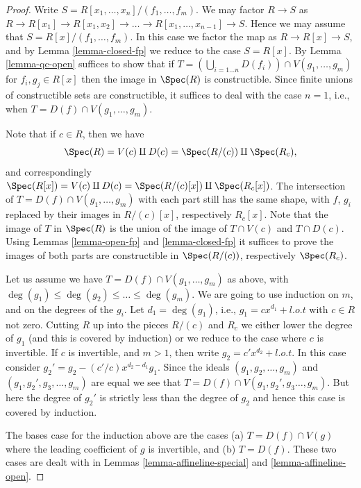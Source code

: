 \begin{proof}
Write $S = R[x_1, \ldots, x_n]/(f_1, \ldots, f_m)$.
We may factor $R \to S$ as $R \to R[x_1] \to R[x_1, x_2]
\to \ldots \to R[x_1, \ldots, x_{n-1}] \to S$. Hence
we may assume that $S = R[x]/(f_1, \ldots, f_m)$.
In this case we factor the map as $R \to R[x] \to S$,
and by Lemma \ref{lemma-closed-fp} we reduce to
the case $S = R[x]$. By Lemma \ref{lemma-qc-open} suffices
to show that if
$T = (\bigcup_{i = 1\ldots n} D(f_i)) \cap V(g_1, \ldots, g_m)$
for $f_i , g_j \in R[x]$ then the image in $\Spec(R)$ is
constructible. Since finite unions of constructible sets
are constructible, it suffices to deal with the case $n = 1$,
i.e., when $T = D(f) \cap V(g_1, \ldots, g_m)$.

\medskip\noindent
Note that if $c \in R$, then we have
$$
\Spec(R) =
V(c) \amalg D(c) =
\Spec(R/(c)) \amalg \Spec(R_c),
$$
and correspondingly $\Spec(R[x]) =
V(c) \amalg D(c) = \Spec(R/(c)[x]) \amalg
\Spec(R_c[x])$. The intersection of $T = D(f) \cap V(g_1, \ldots, g_m)$
with each part still has the same shape, with $f$, $g_i$ replaced
by their images in $R/(c)[x]$, respectively $R_c[x]$.
Note that the image of $T$
in $\Spec(R)$ is the union of the image of
$T \cap V(c)$ and $T \cap D(c)$. Using Lemmas \ref{lemma-open-fp}
and \ref{lemma-closed-fp} it suffices to prove the images of both
parts are constructible in $\Spec(R/(c))$, respectively
$\Spec(R_c)$.

\medskip\noindent
Let us assume we have $T = D(f) \cap V(g_1, \ldots, g_m)$
as above, with $\deg(g_1) \leq \deg(g_2) \leq \ldots \leq \deg(g_m)$.
We are going to use induction on $m$, and on the
degrees of the $g_i$. Let $d_1 = \deg(g_1)$, i.e., $g_1 = c x^{d_1} + l.o.t$
with $c \in R$ not zero. Cutting $R$ up into the pieces
$R/(c)$ and $R_c$ we either lower the degree of $g_1$ (and this
is covered by induction)
or we reduce to the case where $c$ is invertible.
If $c$ is invertible, and $m > 1$, then write
$g_2 = c' x^{d_2} + l.o.t$. In this case consider
$g_2' = g_2 - (c'/c) x^{d_2 - d_1} g_1$. Since the ideals
$(g_1, g_2, \ldots, g_m)$ and $(g_1, g_2', g_3, \ldots, g_m)$
are equal we see that $T = D(f) \cap V(g_1, g_2', g_3\ldots, g_m)$.
But here the degree of $g_2'$ is strictly less than the degree
of $g_2$ and hence this case is covered by induction.

\medskip\noindent
The bases case for the induction above are the cases
(a) $T = D(f) \cap V(g)$ where the leading coefficient
of $g$ is invertible, and (b) $T = D(f)$. These two cases
are dealt with in Lemmas \ref{lemma-affineline-special}
and \ref{lemma-affineline-open}.
\end{proof}











